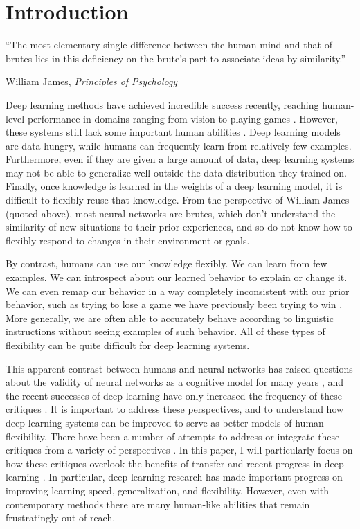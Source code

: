 \chapter{Introduction}
\epigraph{``The most elementary single difference between the human mind and that of brutes lies in this deficiency on the brute's part to associate ideas by similarity.''}{William James, \textit{Principles of Psychology}}
Deep learning methods have achieved incredible success recently, reaching human-level performance in domains ranging from vision \citep[e.g.][]{Szegedy2015} to playing games \citep[e.g.][]{Silver2016}. However, these systems still lack some important human abilities \citep[e.g.][]{Lake2016}. Deep learning models are data-hungry, while humans can frequently learn from relatively few examples. Furthermore, even if they are given a large amount of data, deep learning systems may not be able to generalize well outside the data distribution they trained on. Finally, once knowledge is learned in the weights of a deep learning model, it is difficult to flexibly reuse that knowledge. From the perspective of William James (quoted above), most neural networks are brutes, which don't understand the similarity of new situations to their prior experiences, and so do not know how to flexibly respond to changes in their environment or goals. \par
By contrast, humans can use our knowledge flexibly. We can learn from few examples. We can introspect about our learned behavior to explain or change it. We can even remap our behavior in a way completely inconsistent with our prior behavior, such as trying to lose a game we have previously been trying to win \citep{Lake2016}. More generally, we are often able to accurately behave according to linguistic instructions without seeing examples of such behavior. All of these types of flexibility can be quite difficult for deep learning systems. \par 
This apparent contrast between humans and neural networks has raised questions about the validity of neural networks as a cognitive model for many years \citep[e.g.][]{Fodor1988}, and the recent successes of deep learning have only increased the frequency of these critiques \citep[e.g.][]{Lake2015, Lake2016, Lake2017, Marcus2018}. It is important to address these perspectives, and to understand how deep learning systems can be improved to serve as better models of human flexibility. There have been a number of attempts to address or integrate these critiques from a variety of perspectives \citep[e.g.][]{McClelland1999, McClelland2010}. In this paper, I will particularly focus on how these critiques overlook the benefits of transfer \citep{Lampinen2017a} and recent progress in deep learning \citep{Hansen2017}. In particular, deep learning research has made important progress on improving learning speed, generalization, and flexibility. However, even with contemporary methods there are many human-like abilities that remain frustratingly out of reach. \par
